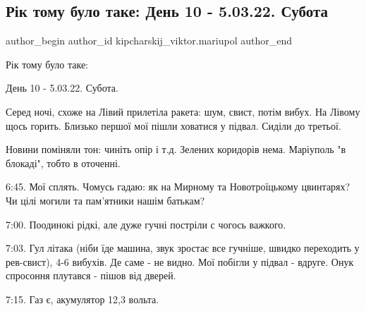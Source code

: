  
 
 
 
 

\subsection{Рік тому було таке: День 10  -  5.03.22. Субота}
\label{sec:05_03_2023.fb.kipcharskij_viktor.mariupol.1.r_k_tomu_bulo_take__}

\ifcmt
 author_begin
   author_id kipcharskij_viktor.mariupol
 author_end
\fi

Рік тому було таке:

День 10  -  5.03.22. Субота. 

Серед ночі, схоже на Лівий прилетіла ракета: шум, свист, потім вибух. На Лівому
щось горить. Близько першої мої пішли ховатися у підвал. Сиділи до третьої.

Новини поміняли тон: чиніть опір і т.д. Зелених коридорів нема. Маріуполь "в
блокаді", тобто в оточенні.

6:45. Мої сплять. Чомусь гадаю: як на Мирному та Новотроїцькому цвинтарях? Чи
цілі могили та пам'ятники нашім батькам?

7:00. Поодинокі рідкі, але дуже гучні постріли с чогось важкого.

7:03. Гул літака (ніби їде машина, звук зростає все гучніше, швидко переходить
у рев-свист), 4-6 вибухів. Де саме - не видно. Мої побігли у підвал - вдруге.
Онук спросоння плутався - пішов від дверей.

7:15. Газ є, акумулятор 12,3 вольта.


